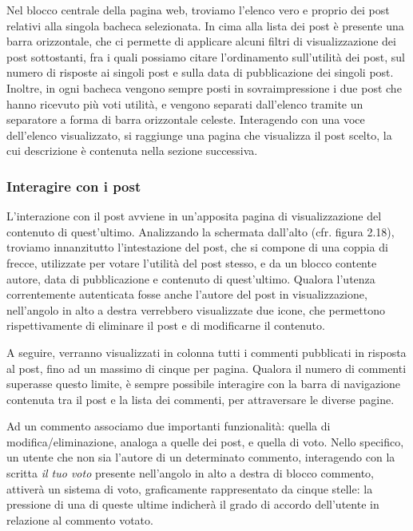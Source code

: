 \documentclass [a4paper,11pt]{book}
\begin{document}


Nel blocco centrale della pagina web, troviamo l'elenco vero e proprio dei post relativi alla singola bacheca selezionata. In cima alla lista dei post è presente una barra orizzontale, che ci permette di applicare alcuni filtri di visualizzazione dei post sottostanti, fra i quali possiamo citare l'ordinamento sull'utilità dei post, sul numero di risposte ai singoli post e sulla data di pubblicazione dei singoli post. Inoltre, in ogni bacheca vengono sempre posti in sovraimpressione i due post che hanno ricevuto più voti utilità, e vengono separati dall'elenco tramite un separatore a forma di barra orizzontale celeste. Interagendo con una voce dell'elenco visualizzato, si raggiunge una pagina che visualizza il post scelto, la cui descrizione è contenuta nella sezione successiva.

\medskip

\subsubsection{Interagire con i post}

L'interazione con il post avviene in un'apposita pagina di visualizzazione del contenuto di quest'ultimo. Analizzando la schermata dall'alto (cfr. figura 2.18), troviamo innanzitutto l'intestazione del post, che si compone di una coppia di frecce, utilizzate per votare l'utilità del post stesso, e da un blocco contente autore, data di pubblicazione e contenuto di quest'ultimo. Qualora l'utenza correntemente autenticata fosse anche l'autore del post in visualizzazione, nell'angolo in alto a destra verrebbero visualizzate due icone, che permettono rispettivamente di eliminare il post e di modificarne il contenuto.


A seguire, verranno visualizzati in colonna tutti i commenti pubblicati in risposta al post, fino ad un massimo di cinque per pagina. Qualora il numero di commenti superasse questo limite, è sempre possibile interagire con la barra di navigazione contenuta tra il post e la lista dei commenti, per attraversare le diverse pagine. 

Ad un commento associamo due importanti funzionalità: quella di modifica/eliminazione, analoga a quelle dei post, e quella di voto. Nello specifico, un utente che non sia l'autore di un determinato commento, interagendo con la scritta \emph{il tuo voto} presente nell'angolo in alto a destra di blocco commento, attiverà un sistema di voto, graficamente rappresentato da cinque stelle: la pressione di una di queste ultime indicherà il grado di accordo dell'utente in relazione al commento votato.
\end{document}
